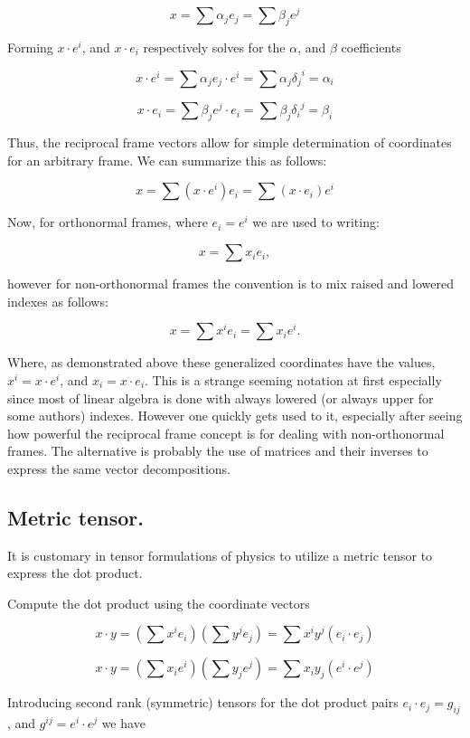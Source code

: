 \documentclass{article}      %
\begin{document}
\[
x = \sum \alpha_j e_j = \sum \beta_j e^j
\]

Forming $x \cdot e^i$, and $x \cdot e_i$ respectively solves for the $\alpha$, and $\beta$ coefficients

\[
x \cdot e^i = \sum \alpha_j e_j \cdot e^i = \sum \alpha_j {\delta_j}^i = \alpha_i
\]

\[
x \cdot e_i = \sum \beta_j e^j \cdot e_i = \sum \beta_j {\delta_i}^j = \beta_i
\]

Thus, the reciprocal frame vectors allow for simple determination of coordinates for an arbitrary frame. We can summarize this as follows:

\[
x = \sum ( x \cdot e^i ) e_i = \sum ( x \cdot e_i ) e^i
\]

Now, for orthonormal frames, where $e_i = e^i$ we are used to writing:

\[
x = \sum x_i e_i,
\]

however for non-orthonormal frames the convention is to mix raised and lowered indexes as follows:

\[
x = \sum x^i e_i = \sum x_i e^i.
\]

Where, as demonstrated above these generalized coordinates have the values, $x^i = x \cdot e^i$, and $x_i = x \cdot e_i$.  This is a strange seeming notation at
first especially since most of linear algebra is done with always lowered (or always upper for some authors) indexes.  However one quickly gets used to it, especially after seeing how powerful the reciprocal frame concept is for dealing with non-orthonormal frames.  The alternative is probably the use of matrices and their inverses to express the same vector decompositions.

\subsection{ Metric tensor. }

It is customary in tensor formulations of physics to utilize a metric tensor to express the dot product.

Compute the dot product using the coordinate vectors

\[
x \cdot y = \left(\sum x^i e_i \right)\left(\sum y^j e_j \right) = \sum x^i y^j \left( e_i \cdot e_j \right)
\]

\[
x \cdot y = \left(\sum x_i e^i \right)\left(\sum y_j e^j \right) = \sum x_i y_j \left( e^i \cdot e^j \right)
\]

Introducing second rank (symmetric) tensors for the dot product pairs $ e_i \cdot e_j = g_{ij}$, and $ g^{ij} = e^i \cdot e^j $ we have
\end{document}
